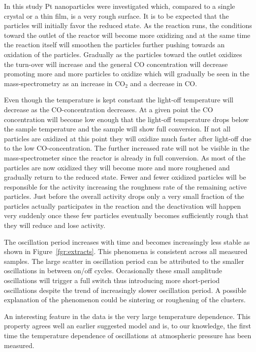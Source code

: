 \documentclass[8.5pt,twoside,twocolumn]{article}
\begin{document}
In this study Pt nanoparticles were investigated which, compared to a single crystal or a thin film, is a very rough surface. It is to be expected that the particles will initially favor the reduced state. As the reaction runs, the conditions toward the outlet of the reactor will become more oxidizing and at the same time the reaction itself will smoothen the particles further pushing towards an oxidation of the particles. Gradually as the particles toward the outlet oxidizes the turn-over will increase and the general CO concentration will decrease promoting more and more particles to oxidize which will gradually be seen in the mass-spectrometry as an increase in CO$_2$ and a decrease in CO. 

Even though the temperature is kept constant the light-off temperature will decrease as the CO-concentration decreases. At a given point the CO concentration will become low enough that the light-off temperature drops below the sample temperature and the sample will show full conversion. If not all particles are oxidized at this point they will oxidize much faster after light-off due to the low CO-concentration. The further increased rate will not be visible in the mass-spectrometer since the reactor is already in full conversion. As most of the particles are now oxidized they will become more and more roughened and gradually return to the reduced state. Fewer and fewer oxidized particles will be responsible for the activity increasing the roughness rate of the remaining active particles. Just before the overall activity drops only a very small fraction of the particles actually participates in the reaction and the deactivation will happen very suddenly once these few particles eventually becomes sufficiently rough that they will reduce and lose activity.

The oscillation period increases with time and becomes increasingly less stable as shown in Figure~\ref{fgr:extracts}. This phenomena is consistent across all measured samples. The large scatter in oscillation period can be attributed to the smaller oscillations in between on/off cycles. Occasionally these small amplitude oscillations will trigger a full switch thus introducing more short-period oscillations despite the trend of increasingly slower oscillation period. A possible explanation of the phenomenon could be sintering or roughening of the clusters.

An interesting feature in the data is the very large temperature dependence. This property agrees well an earlier suggested model \cite{Hendriksen2010} and is, to our knowledge, the first time the temperature dependence of oscillations at atmospheric pressure has been measured.
\end{document}
